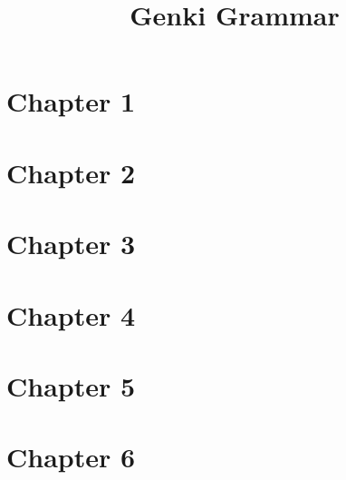 \documentclass{article}
\title{Genki Grammar}
\makeatletter
\newcommand{\getCurrentSectionNumber}{%
  \ifnum\c@section=0 %
  \thechapter
  \else
  \ifnum\c@subsection=0 %
  \thesection
  \else
  \ifnum\c@subsubsection=0 %
  \thesubsection
  \else
  \thesubsubsection
  \fi
  \fi
  \fi
}
\newcommand{\inputchapter}[2]{\section{Chapter #1}\label{\getCurrentSectionNumber}}
\makeatother
\begin{document}
\tableofcontents

\inputchapter{1}{01.tex}
\inputchapter{2}{02.tex}
\inputchapter{3}{03.tex}
\inputchapter{4}{04.tex}
\inputchapter{5}{05.tex}
\inputchapter{6}{06.tex}
\end{document}
